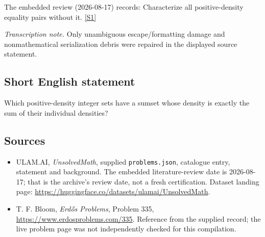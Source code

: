 \documentclass[11pt,a4paper]{article}
\newcommand{\sref}[2]{\hyperlink{source:#1:#2}{[S#2]}}
\begin{document}
The embedded review (2026-08-17) records: Characterize all positive-density equality pairs without it. \sref{statement}{1}

{\small\emph{Transcription note.} Only unambiguous escape/formatting damage and nonmathematical serialization debris were repaired in the displayed source statement.}

\subsection{Short English statement}

Which positive-density integer sets have a sumset whose density is exactly the sum of their individual densities?

\subsection{Sources}

{\small

\begin{itemize}

\item[\hypertarget{source:statement:1}{S1}] ULAM.AI, \emph{UnsolvedMath}, supplied \texttt{problems.json}, catalogue entry, statement and background. The embedded literature-review date is 2026-08-17; that is the archive’s review date, not a fresh certification. Dataset landing page: \url{https://huggingface.co/datasets/ulamai/UnsolvedMath}.

\item[\hypertarget{source:statement:2}{S2}] T. F. Bloom, \emph{Erdős Problems}, Problem 335, \url{https://www.erdosproblems.com/335}. Reference from the supplied record; the live problem page was not independently checked for this compilation.

\end{itemize}

}

\label{end:statement}
\end{document}
